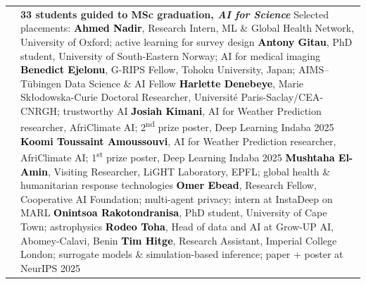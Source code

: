 \documentclass[a4paper,11pt,oneside]{article}
\makeatletter
\newcommand{\light}[1]{\textcolor{cvgray}{{\small #1}}}
\newlength{\datecol}\setlength{\datecol}{2.3cm}
\newlength{\contentcol}
\newlength{\supdatecol}\setlength{\supdatecol}{2cm}
\newlength{\supcontentcol}
\newcommand{\suprow}[2]{%
  \begingroup
  \arrayrulecolor{cvblue}%
  \setlength{\arrayrulewidth}{0.5pt}%
  \setlength{\extrarowheight}{0.5pt}%
  \noindent\begin{tabular}{@{}%
      >{\centering\arraybackslash}m{\supdatecol}%
      @{\hspace{6pt}}|@{\hspace{8pt}}%
      >{\arraybackslash}m{\supcontentcol}@{}}
    {\small #1} & #2
  \end{tabular}%
  \endgroup
  \vspace{7pt}\par}
\makeatother
\begin{document}
\suprow{2024\,--\,2025}{%
  \textbf{33 students guided to MSc graduation, \textit{AI for Science}}\newline
  \light{Selected placements:}\newline
  \light{\textbf{\textcolor{black}{Ahmed Nadir}}, Research Intern, ML \& Global Health Network, University of Oxford; active learning for survey design}\newline
  \light{\textbf{\textcolor{black}{Antony Gitau}}, PhD student, University of South-Eastern Norway; AI for medical imaging}\newline
  \light{\textbf{\textcolor{black}{Benedict Ejelonu}}, G-RIPS Fellow, Tohoku University, Japan; AIMS--T\"ubingen Data Science \& AI Fellow}\newline
  \light{\textbf{\textcolor{black}{Harlette Denebeye}}, Marie Sk\l{}odowska-Curie Doctoral Researcher, Universit\'e Paris-Saclay/CEA-CNRGH; trustworthy AI}\newline
  \light{\textbf{\textcolor{black}{Josiah Kimani}}, AI for Weather Prediction researcher, AfriClimate AI; 2\textsuperscript{nd} prize poster, Deep Learning Indaba 2025}\newline
  \light{\textbf{\textcolor{black}{Koomi Toussaint Amoussouvi}}, AI for Weather Prediction researcher, AfriClimate AI; 1\textsuperscript{st} prize poster, Deep Learning Indaba 2025}\newline
  \light{\textbf{\textcolor{black}{Mushtaha El-Amin}}, Visiting Researcher, LiGHT Laboratory, EPFL; global health \& humanitarian response technologies}\newline
  \light{\textbf{\textcolor{black}{Omer Ebead}}, Research Fellow, Cooperative AI Foundation; multi-agent privacy; intern at InstaDeep on MARL}\newline
  \light{\textbf{\textcolor{black}{Onintsoa Rakotondranisa}}, PhD student, University of Cape Town; astrophysics}\newline
  \light{\textbf{\textcolor{black}{Rodeo Toha}}, Head of data and AI at Grow-UP AI, Abomey-Calavi, Benin}\newline
  \light{\textbf{\textcolor{black}{Tim Hitge}}, Research Assistant, Imperial College London; surrogate models \& simulation-based inference; paper + poster at NeurIPS 2025}%
}
\vspace{2ex}
\end{document}
